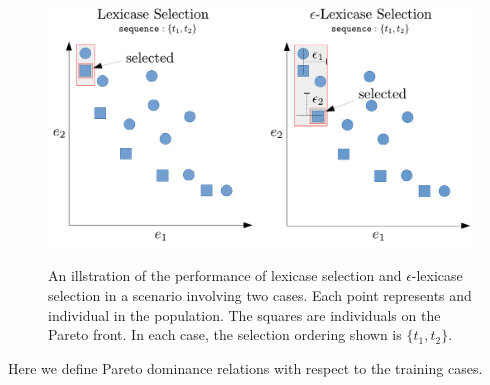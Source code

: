 \documentclass[preprint]{article}
\begin{document}
\begin{figure}
\centering
  \includegraphics[width = \textwidth]{figs/lex_pareto.pdf}\\
  \caption{An illstration of the performance of lexicase selection and $\epsilon$-lexicase selection in a scenario involving two cases. Each point represents and individual in the population. The squares are individuals on the Pareto front. In each case, the selection ordering shown is $\{t_1,t_2\}$. }\label{fig:boxplot_eps_e}
\end{figure}
Here we define Pareto dominance relations with respect to the training cases. 
\end{document}
